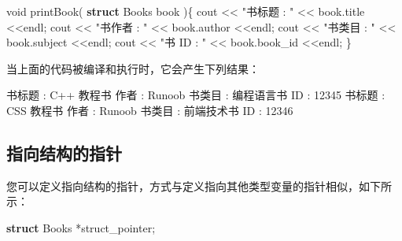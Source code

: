 \documentclass[
]{article}
\newenvironment{Shaded}{}{}
\newcommand{\DataTypeTok}[1]{\textcolor[rgb]{0.56,0.13,0.00}{#1}}
\newcommand{\DecValTok}[1]{\textcolor[rgb]{0.25,0.63,0.44}{#1}}
\newcommand{\KeywordTok}[1]{\textcolor[rgb]{0.00,0.44,0.13}{\textbf{#1}}}
\newcommand{\NormalTok}[1]{#1}
\newcommand{\OperatorTok}[1]{\textcolor[rgb]{0.40,0.40,0.40}{#1}}
\newcommand{\StringTok}[1]{\textcolor[rgb]{0.25,0.44,0.63}{#1}}
\begin{document}
\begin{Shaded}
\begin{Highlighting}[]
\DataTypeTok{void}\NormalTok{ printBook}\OperatorTok{(} \KeywordTok{struct}\NormalTok{ Books book }\OperatorTok{)\{}
\NormalTok{   cout }\OperatorTok{\textless{}\textless{}} \StringTok{"书标题 : "} \OperatorTok{\textless{}\textless{}}\NormalTok{ book}\OperatorTok{.}\NormalTok{title }\OperatorTok{\textless{}\textless{}}\NormalTok{endl}\OperatorTok{;}   
\NormalTok{   cout }\OperatorTok{\textless{}\textless{}} \StringTok{"书作者 : "} 
   \OperatorTok{\textless{}\textless{}}\NormalTok{ book}\OperatorTok{.}\NormalTok{author }\OperatorTok{\textless{}\textless{}}\NormalTok{endl}\OperatorTok{;}   
\NormalTok{   cout }\OperatorTok{\textless{}\textless{}} \StringTok{"书类目 : "} \OperatorTok{\textless{}\textless{}}\NormalTok{ book}\OperatorTok{.}\NormalTok{subject }\OperatorTok{\textless{}\textless{}}\NormalTok{endl}\OperatorTok{;}   
\NormalTok{   cout }\OperatorTok{\textless{}\textless{}} \StringTok{"书 ID : "} \OperatorTok{\textless{}\textless{}}\NormalTok{ book}\OperatorTok{.}\NormalTok{book\_id }\OperatorTok{\textless{}\textless{}}\NormalTok{endl}\OperatorTok{;}
\OperatorTok{\}}
\end{Highlighting}
\end{Shaded}

当上面的代码被编译和执行时，它会产生下列结果：

\begin{Shaded}
\begin{Highlighting}[]
\NormalTok{书标题 }\OperatorTok{:}\NormalTok{ C}\OperatorTok{++}\NormalTok{ 教程书}
\NormalTok{作者 }\OperatorTok{:}\NormalTok{ Runoob}
\NormalTok{书类目 }\OperatorTok{:}\NormalTok{ 编程语言书 }
\NormalTok{ID }\OperatorTok{:} \DecValTok{12345}
\NormalTok{书标题 }\OperatorTok{:}\NormalTok{ CSS 教程书}
\NormalTok{作者 }\OperatorTok{:}\NormalTok{ Runoob}
\NormalTok{书类目 }\OperatorTok{:}\NormalTok{ 前端技术书 }
\NormalTok{ID }\OperatorTok{:} \DecValTok{12346}
\end{Highlighting}
\end{Shaded}

\hypertarget{ux6307ux5411ux7ed3ux6784ux7684ux6307ux9488}{%
\subsection{指向结构的指针}\label{ux6307ux5411ux7ed3ux6784ux7684ux6307ux9488}}

您可以定义指向结构的指针，方式与定义指向其他类型变量的指针相似，如下所示：

\begin{Shaded}
\begin{Highlighting}[]
\KeywordTok{struct}\NormalTok{ Books }\OperatorTok{*}\NormalTok{struct\_pointer}\OperatorTok{;}
\end{Highlighting}
\end{Shaded}
\end{document}
